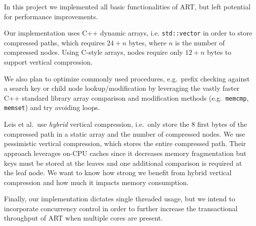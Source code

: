 \documentclass[abstracton,12pt]{scrartcl}
\theoremstyle{definition}
\begin{document}
In this project we implemented all basic functionalities of ART, but left 
potential for performance improvements.

Our implementation uses C++ dynamic arrays, i.e. \texttt{std::vector} in order
to store compressed paths, which requires $24 + n$ bytes, where $n$ is the
number of compressed nodes. Using C-style arrays, nodes require only $12 + n$
bytes to support vertical compression.

We also plan to optimize commonly used procedures, e.g.\ prefix checking
against a search key or child node lookup/modification by leveraging the vastly
faster C++ standard library array comparison and modification methods
(e.g.\ \texttt{memcmp}, \texttt{memset}) and try avoiding loops.

Leis et al.\ use \textit{hybrid} vertical compression, i.e.\ only store the
8 first bytes of the compressed path in a static array and the number of
compressed nodes. We use pessimistic vertical compression, which stores
the entire compressed path.
Their approach leverages on-CPU caches since it decreases memory fragmentation
but keys must be stored at the leaves and one additional comparison is
required at the leaf node. We want to know how strong we benefit from hybrid 
vertical compression and how much it impacts memory consumption.

Finally, our implementation dictates single threaded usage, but we intend to
incorporate concurrency control in order to further increase the transactional
throughput of ART when multiple cores are present.

\newpage



\end{document}
